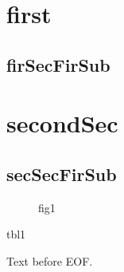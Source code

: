 \documentclass{article}
\begin{document}
\doublespacing

\tableofcontents

\singlespacing

\section{first}
\subsection{firSecFirSub}


\setcounter{section}{7}

\section{secondSec}
\subsection{secSecFirSub}

\begin{figure}
    \caption{fig1}
\end{figure}

\begin{table}
    \caption{tbl1}
\end{table}

\begin{appendix}
    \listoftables
    \listoffigures
\end{appendix}

Text before EOF.
\end{document}
